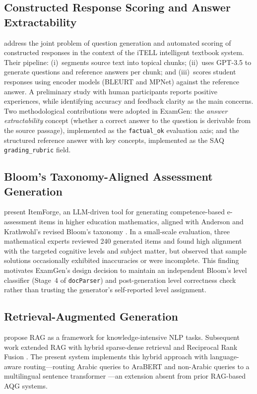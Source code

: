 \documentclass[12pt, a4paper]{article}
\begin{document}
\subsection{Constructed Response Scoring and Answer Extractability}

\citet{morris2024aqg} address the joint problem of question generation and
automated scoring of constructed responses in the context of the iTELL intelligent
textbook system. Their pipeline: (i)~segments source text into topical chunks;
(ii)~uses GPT-3.5 to generate questions and reference answers per chunk; and
(iii)~scores student responses using encoder models (BLEURT and MPNet) against
the reference answer. A preliminary study with human participants reports positive
experiences, while identifying accuracy and feedback clarity as the main concerns.
Two methodological contributions were adopted in ExamGen: the \textit{answer
extractability} concept (whether a correct answer to the question is derivable
from the source passage), implemented as the \texttt{factual\_ok} evaluation axis;
and the structured reference answer with key concepts, implemented as the SAQ
\texttt{grading\_rubric} field.

\subsection{Bloom's Taxonomy-Aligned Assessment Generation}

\citet{meissner2024itemforge} present ItemForge, an LLM-driven tool for generating
competence-based e-assessment items in higher education mathematics, aligned with
Anderson and Krathwohl's revised Bloom's taxonomy \cite{bloom2001}. In a small-scale
evaluation, three mathematical experts reviewed 240 generated items and found high
alignment with the targeted cognitive levels and subject matter, but observed that
sample solutions occasionally exhibited inaccuracies or were incomplete. This finding
motivates ExamGen's design decision to maintain an independent Bloom's level
classifier (Stage~4 of \texttt{docParser}) and post-generation level correctness
check rather than trusting the generator's self-reported level assignment.

\subsection{Retrieval-Augmented Generation}

\citet{lewis2020rag} propose RAG as a framework for knowledge-intensive NLP tasks.
Subsequent work extended RAG with hybrid sparse-dense retrieval \cite{ma2021replication}
and Reciprocal Rank Fusion \cite{cormack2009rrf}. The present system implements
this hybrid approach with language-aware routing---routing Arabic queries to AraBERT
\cite{antoun2020arabert} and non-Arabic queries to a multilingual sentence transformer
\cite{reimers2019sentence}---an extension absent from prior RAG-based AQG systems.
\end{document}

